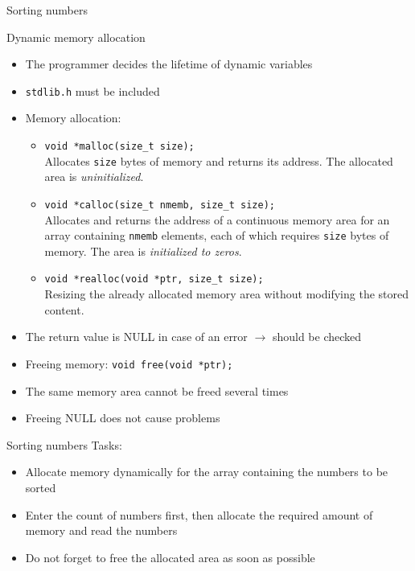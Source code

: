 \documentclass[usenames,dvipsnames,aspectratio=169]{beamer}
\begin{document}
\begin{frame}{Sorting numbers}
  \begin{exampleblock}{}
    
  \end{exampleblock}
\end{frame}

\begin{frame}{Dynamic memory allocation}
  \begin{itemize}
    \small
    \item The programmer decides the lifetime of dynamic variables
    \item \texttt{stdlib.h} must be included
    \item Memory allocation:\\
      \begin{itemize}
        \item \texttt{void *malloc(size\_t size);} \\
          Allocates \texttt{size} bytes of memory and returns its address. The allocated area is \emph{uninitialized}.
        \item \texttt{void *calloc(size\_t nmemb, size\_t size);} \\
          Allocates and returns the address of a continuous memory area for an array containing \texttt{nmemb} elements, each of which requires \texttt{size} bytes of memory. The area is \emph{initialized to zeros}.
        \item \texttt{void *realloc(void *ptr, size\_t size);} \\
          Resizing the already allocated memory area without modifying the stored content.
      \end{itemize}
    \item The return value is NULL in case of an error $\to$ should be checked
    \item Freeing memory: \texttt{void free(void *ptr);}
    \item The same memory area cannot be freed several times
    \item Freeing NULL does not cause problems
  \end{itemize}
\end{frame}

\begin{frame}{Sorting numbers}
  Tasks:
  \begin{itemize}
    \item Allocate memory dynamically for the array containing the numbers to be sorted
    \item Enter the count of numbers first, then allocate the required amount of memory and read the numbers
    \item Do not forget to free the allocated area as soon as possible
  \end{itemize}
\end{frame}
\end{document}
